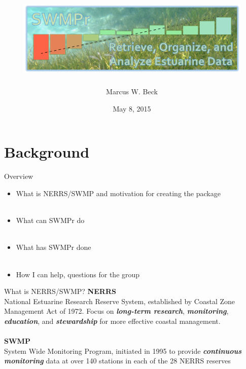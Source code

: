 \documentclass[serif]{beamer}\usepackage[]{graphicx}\usepackage[]{color}
\newcommand{\Bigtxt}[1]{\textbf{\textit{#1}}}
\begin{document}
\title[SWMPr for estuarine time series]{\includegraphics[width=0.85\textwidth]{fig/swmpr_logo.png}}

\author[M. Beck]{Marcus W. Beck}

\date{May 8, 2015}


\begin{frame}
\titlepage
\end{frame}

\section{Background}

\begin{frame}{Overview}
\begin{itemize}
\item What is NERRS/SWMP and motivation for creating the package \\~\\
\item What can SWMPr do \\~\\
\item What has SWMPr done \\~\\
\item How I can help, questions for the group
\end{itemize}
\end{frame}

\begin{frame}{What is NERRS/SWMP?}{}
{\bf NERRS}\\
National Estuarine Research Reserve System, established by Coastal Zone Management Act of 1972. Focus on \Bigtxt{long-term research}, \Bigtxt{monitoring}, \Bigtxt{education}, and \Bigtxt{stewardship} for more effective coastal management.\\~\\
{\bf SWMP}\\
System Wide Monitoring Program, initiated in 1995 to provide \Bigtxt{continuous monitoring} data at over 140 stations in each of the 28 NERRS reserves \\~\\
\end{frame}
\end{document}
